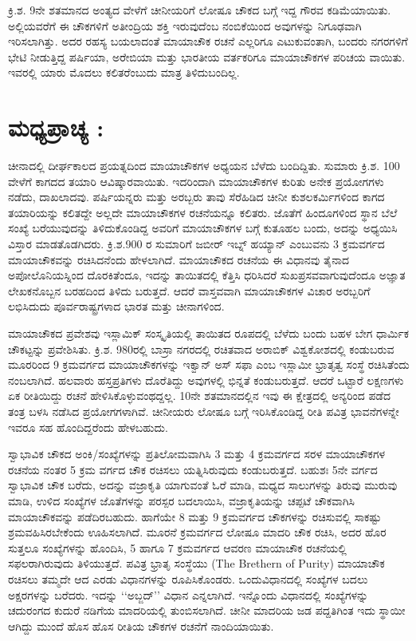 ಕ್ರಿ.ಶ. 9ನೇ ಶತಮಾನದ ಅಂತ್ಯದ ವೇಳೆಗೆ ಚೀನೀಯರಿಗೆ ಲೋಷೂ ಚೌಕದ ಬಗ್ಗೆ ಇದ್ದ ಗೌರವ ಕಡಿಮೆಯಾಯಿತು. ಅಲ್ಲಿಯವರೆಗೆ ಈ ಚೌಕಗಳಿಗೆ ಅತೀಂದ್ರಿಯ ಶಕ್ತಿ ಇರುವುದೆಂಬ ನಂಬಿಕೆಯಿಂದ ಅವುಗಳನ್ನು ನಿಗೂಢವಾಗಿ ಇರಿಸಲಾಗಿತ್ತು. ಅದರ ರಹಸ್ಯ ಬಯಲಾದಂತೆ ಮಾಯಾಚೌಕ ರಚನೆ ಎಲ್ಲರಿಗೂ ಎಟುಕುವಂತಾಗಿ, ಬಂದರು ನಗರಗಳಿಗೆ ಭೇಟಿ ನೀಡುತ್ತಿದ್ದ ಪರ್ಷಿಯಾ, ಅರೇಬಿಯಾ ಮತ್ತು ಭಾರತೀಯ ವರ್ತಕರಿಗೂ ಮಾಯಾಚೌಕಗಳ ಪರಿಚಯ ವಾಯಿತು. ಇವರಲ್ಲಿ ಯಾರು ಮೊದಲು ಕಲಿತರೆಂಬುದು ಮಾತ್ರ ತಿಳಿದುಬಂದಿಲ್ಲ.

\section*{ಮಧ್ಯಪ್ರಾಚ್ಯ :}

ಚೀನಾದಲ್ಲಿ ದೀರ್ಘಕಾಲದ ಪ್ರಯತ್ನದಿಂದ ಮಾಯಾಚೌಕಗಳ ಅಧ್ಯಯನ ಬೆಳೆದು ಬಂದಿದ್ದಿತು. ಸುಮಾರು ಕ್ರಿ.ಶ. 100 ವೇಳೆಗೆ ಕಾಗದದ ತಯಾರಿ ಆವಿಷ್ಕಾರವಾಯಿತು. ಇದರಿಂದಾಗಿ ಮಾಯಾಚೌಕಗಳ ಕುರಿತು ಅನೇಕ ಪ್ರಯೋಗಗಳು ನಡೆದು, ದಾಖಲಾದವು. ಪರ್ಷಿಯನ್ನರು ಮತ್ತು ಅರಬ್ಬರು ತಾವು ಸೆರೆಹಿಡಿದ ಚೀನೀ ಕುಶಲಕರ್ಮಿಗಳಿಂದ ಕಾಗದ ತಯಾರಿಯನ್ನು ಕಲಿತದ್ದೇ ಅಲ್ಲದೇ ಮಾಯಾಚೌಕಗಳ ರಚನೆಯನ್ನೂ ಕಲಿತರು. ಜೊತೆಗೆ ಹಿಂದೂಗಳಿಂದ ಸ್ಥಾನ ಬೆಲೆ ಸಂಖ್ಯೆ ಬರೆಯುವುದನ್ನು ತಿಳಿದುಕೊಂಡಿದ್ದ ಅವರಿಗೆ ಮಾಯಾಚೌಕಗಳ ಬಗ್ಗೆ ಕುತೂಹಲ ಬಂದು, ಅದನ್ನು ಅಧ್ಯಯಿಸಿ ವಿಸ್ತಾರ ಮಾಡತೊಡಗಿದರು. ಕ್ರಿ.ಶ.900 ರ ಸುಮಾರಿಗೆ ಜಬೀರ್ ಇಬ್ನ್ ಹಯ್ಯಾನ್ ಎಂಬುವನು 3 ಕ್ರಮವರ್ಗದ ಮಾಯಾಚೌಕವನ್ನು ರಚಿಸಿದನೆಂದು ಹೇಳಲಾಗಿದೆ. ಮಾಯಾಚೌಕದ ರಚನೆಯ ಈ ವಿಧಾನವು ತೈನಾದ ಅಪೋಲೊನಿಯಸ್ನಿಂದ ದೊರಕಿತೆಂದೂ, ಇದನ್ನು ತಾಯಿತದಲ್ಲಿ ಕೆತ್ತಿಸಿ ಧರಿಸಿದರೆ ಸುಖಪ್ರಸವವಾಗುವುದೆಂದೂ ಅಜ್ಞಾತ ಲೇಖಕನೊಬ್ಬನ ಬರಹದಿಂದ ತಿಳಿದು ಬರುತ್ತದೆ. ಆದರೆ ವಾಸ್ತವವಾಗಿ ಮಾಯಾಚೌಕಗಳ ವಿಚಾರ ಅರಬ್ಬರಿಗೆ ಲಭಿಸಿದುದು ಪೂರ್ವರಾಷ್ಟ್ರಗಳಾದ ಭಾರತ ಮತ್ತು ಚೀನಾಗಳಿಂದ.

ಮಾಯಾಚೌಕದ ಪ್ರವೇಶವು ಇಸ್ಲಾಮಿಕ್ ಸಂಸ್ಕೃತಿಯಲ್ಲಿ ತಾಯಿತದ ರೂಪದಲ್ಲಿ ಬೆಳೆದು ಬಂದು ಬಹಳ ಬೇಗ ಧಾರ್ಮಿಕ ಚೌಕಟ್ಟನ್ನು ಪ್ರವೇಶಿಸಿತು. ಕ್ರಿ.ಶ. 980ರಲ್ಲಿ ಬಾಸ್ರಾ ನಗರದಲ್ಲಿ ರಚಿತವಾದ ಅರಾಬಿಕ್ ವಿಶ್ವಕೋಶದಲ್ಲಿ ಕಂಡುಬರುವ ಮೂರರಿಂದ 9 ಕ್ರಮವರ್ಗದ ಮಾಯಾಚೌಕಗಳನ್ನು ಇಕ್ವಾನ್ ಅಸ್ ಸಫಾ ಎಂಬ ಇಸ್ಲಾಮೀ ಭ್ರಾತೃತ್ವ ಸಂಸ್ಥೆ ರಚಿಸಿತೆಂದು ನಂಬಲಾಗಿದೆ. ಹಲವಾರು ಹಸ್ತಪ್ರತಿಗಳು ದೊರೆತಿದ್ದು ಅವುಗಳಲ್ಲಿ ಭಿನ್ನತೆ ಕಂಡುಬರುತ್ತದೆ. ಆದರೆ ಒಟ್ಟಾರೆ ಲಕ್ಷಣಗಳು ಏಕ ರೀತಿಯಿದ್ದು ರಚನೆ ಹೇಳಿಸಿಕೊಳ್ಳುವಂಥದ್ದಲ್ಲ. 10ನೇ ಶತಮಾನದಲ್ಲಿನ ಇವು ಈ ಕ್ಷೇತ್ರದಲ್ಲಿ ಅನ್ಯರಿಂದ ಪಡೆದ ತಂತ್ರ ಬಳಸಿ ನಡೆಸಿದ ಪ್ರಯೋಗಗಳಾಗಿವೆ. ಚೀನೀಯರು ಲೋಷೂ ಬಗ್ಗೆ ಇರಿಸಿಕೊಂಡಿದ್ದ ರೀತಿ ಪವಿತ್ರ ಭಾವನೆಗಳನ್ನೇ ಇವರೂ ಸಹ ಹೊಂದಿದ್ದರೆಂದು ಹೇಳಬಹುದು.

ಸ್ವಾಭಾವಿಕ ಚೌಕದ ಅಂಕಿ/ಸಂಖ್ಯೆಗಳನ್ನು ಪ್ರತಿಲೋಮವಾಗಿಸಿ 3 ಮತ್ತು 4 ಕ್ರಮವರ್ಗದ ಸರಳ ಮಾಯಾಚೌಕಗಳ ರಚನೆಯ ನಂತರ 5 ಕ್ರಮ ವರ್ಗದ ಚೌಕ ರಚಿಸಲು ಯತ್ನಿಸಿರುವುದು ಕಂಡುಬರುತ್ತದೆ. ಬಹುಶಃ 5ನೇ ವರ್ಗದ ಸ್ವಾಭಾವಿಕ ಚೌಕ ಬರೆದು, ಅದನ್ನು ವಜ್ರಾಕೃತಿ ಯಾಗುವಂತೆ ಓರೆ ಮಾಡಿ, ಮಧ್ಯದ ಸಾಲುಗಳನ್ನು ತಿರುವು ಮುರುವು ಮಾಡಿ, ಉಳಿದ ಸಂಖ್ಯೆಗಳ ಜೊತೆಗಳನ್ನು ಪರಸ್ಪರ ಬದಲಾಯಿಸಿ, ವಜ್ರಾಕೃತಿಯನ್ನು ಚಪ್ಪಟೆ ಚೌಕವಾಗಿಸಿ ಮಾಯಾಚೌಕವನ್ನು ಪಡೆದಿರಬಹುದು. ಹಾಗೆಯೇ 8 ಮತ್ತು 9 ಕ್ರಮವರ್ಗದ ಚೌಕಗಳನ್ನು ರಚಿಸುವಲ್ಲಿ ಸಾಕಷ್ಟು ಶ್ರಮವಹಿಸಿರಬೇಕೆಂದು ಊಹಿಸಲಾಗಿದೆ. ಮೂರನೆ ಕ್ರಮವರ್ಗದ ಲೋಷೂ ಮಾದರಿ ಚೌಕ
ರಚಿಸಿ, ಅದರ ಹೊರ ಸುತ್ತಲೂ ಸಂಖ್ಯೆಗಳನ್ನು ಹೊಂದಿಸಿ, 5 ಹಾಗೂ 7 ಕ್ರಮವರ್ಗದ ಆವರಣ ಮಾಯಾಚೌಕ ರಚನೆಯಲ್ಲಿ ಸಫಲರಾಗಿರುವುದು ತಿಳಿಯುತ್ತದೆ. ಪವಿತ್ರ ಭ್ರಾತೃ ಸಂಸ್ಥೆಯು (The Brethern of Purity) ಮಾಯಾಚೌಕ ರಚಿಸಲು ತಮ್ಮದೇ ಆದ ಎರಡು ವಿಧಾನಗಳನ್ನು ರೂಪಿಸಿಕೊಂಡರು. ಒಂದುವಿಧಾನದಲ್ಲಿ ಸಂಖ್ಯೆಗಳ ಬದಲು ಅಕ್ಷರಗಳನ್ನು ಬರೆದರು. ಇದನ್ನು ‘‘ಅಬ್ಜದ್’’ ವಿಧಾನ ಎನ್ನಲಾಗಿದೆ. ಇನ್ನೊಂದು ವಿಧಾನದಲ್ಲಿ ಸಂಖ್ಯೆಗಳನ್ನು ಚದುರಂಗದ ಕುದುರೆ ನಡಿಗೆಯ ಮಾದರಿಯಲ್ಲಿ ತುಂಬಿಸಲಾಗಿದೆ. ಚೀನೀ ಮಾದರಿಯ ಜಡ ಪದ್ದತಿಗಿಂತ ಇದು ಸ್ಥಾಯೀ ಆಗಿದ್ದು ಮುಂದೆ ಹೊಸ ಹೊಸ ರೀತಿಯ ಚೌಕಗಳ ರಚನೆಗೆ ನಾಂದಿಯಾಯಿತು.

